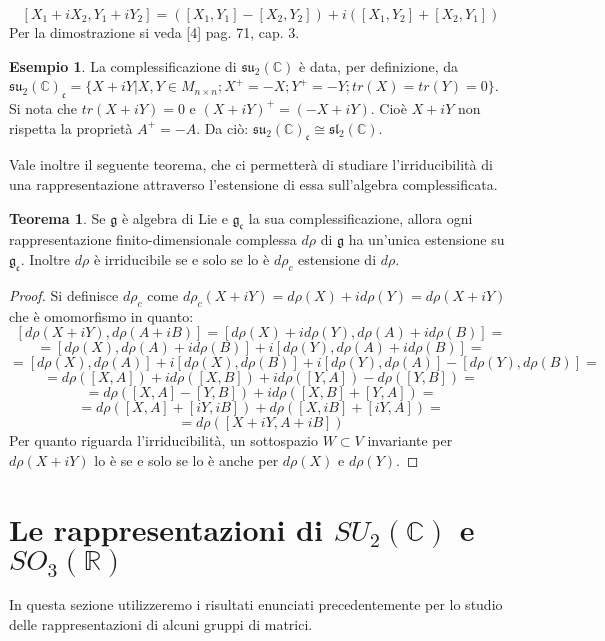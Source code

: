 \documentclass[12pt,a4paper]{report}
\theoremstyle{definition}
\newtheorem{Theo}[Def]{Teorema}
\theoremstyle{definition}
\newtheorem{Ex}[Def]{Esempio}
\theoremstyle{definition}
\theoremstyle{definition}
\begin{document}
$$[X_1+iX_2,Y_1+iY_2]=([X_1,Y_1]-[X_2,Y_2])+i([X_1,Y_2]+[X_2,Y_1])$$
Per la dimostrazione si veda [4] pag. 71, cap. 3.\\
\begin{Ex}
La complessificazione di $\mathfrak{su_2(\mathbb{C})}$ è data, per definizione, da \\$\mathfrak{su_2(\mathbb{C})_c}=\{X+iY|X,Y\in M_{n\times n} ;X^{+}=-X;Y^{+}=-Y;tr(X)=tr(Y)=0\}$.\\
Si nota che $tr(X+iY)=0$ e $(X+iY)^+=(-X+iY)$. Cioè $X+iY$ non rispetta la proprietà $A^+=-A$. Da ciò: $\mathfrak{su_2(\mathbb{C})_c}\cong \mathfrak{sl_2(\mathbb{C})}$.
\end{Ex}
Vale inoltre il seguente teorema, che ci permetterà di studiare l'irriducibilità di una rappresentazione attraverso l'estensione di essa sull'algebra complessificata.
\begin{Theo}
	Se $\mathfrak{g}$ è algebra di Lie e $\mathfrak{g_c}$ la sua complessificazione, allora ogni rappresentazione finito-dimensionale complessa  $d\rho$ di $\mathfrak{g}$ ha un'unica estensione su $\mathfrak{g_c}$. Inoltre $d\rho$ è irriducibile se e solo se lo è $d\rho_c$ estensione di $d\rho$.
\end{Theo}
\begin{proof}
	Si definisce $d\rho_c$ come $d\rho_c(X+iY)=d\rho(X)+id\rho(Y)=d\rho(X+iY)$ che è omomorfismo in quanto: 
	$$[d\rho(X+iY),d\rho(A+iB)]=[d\rho(X)+id\rho(Y),d\rho(A)+id\rho(B)]=$$$$=[d\rho(X),d\rho(A)+id\rho(B)]+i[d\rho(Y),d\rho(A)+id\rho(B)]=$$
	$$=[d\rho(X),d\rho(A)]+i[d\rho(X),d\rho(B)]+i[d\rho(Y),d\rho(A)]-[d\rho(Y),d\rho(B)]=$$
	$$=d\rho([X,A])+id\rho([X,B])+id\rho([Y,A])-d\rho([Y,B])=$$
	$$=d\rho([X,A]-[Y,B])+id\rho([X,B]+[Y,A])=$$
	$$=d\rho([X,A]+[iY,iB])+d\rho([X,iB]+[iY,A])=$$
	$$=d\rho([X+iY,A+iB])$$
	Per quanto riguarda l'irriducibilità, un sottospazio $W\subset V$ invariante per $d\rho(X+iY)$ lo è se e solo se lo è anche per $d\rho(X)$ e $d\rho(Y)$.
\end{proof}
\section{Le rappresentazioni di $SU_2(\mathbb{C})$ e $SO_3(\mathbb{R})$} 
In questa sezione utilizzeremo i risultati enunciati precedentemente per lo studio delle rappresentazioni di alcuni gruppi di matrici.
\end{document}
